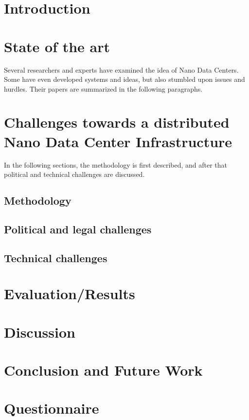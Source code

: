 
\section{Introduction}


\section{State of the art}
\label{StateOfTheArt}
Several researchers and experts have examined the idea of Nano Data Centers. Some have even developed systems and ideas, but also stumbled upon issues and hurdles. Their papers are summarized in the following paragraphs. 




\section{Challenges towards a distributed Nano Data Center Infrastructure}
\label{sec:challenges}
In the following sections, the methodology is first described, and after that political and technical challenges are discussed. 

\subsection{Methodology}



\subsection{Political and legal challenges}


\subsection{Technical challenges}


\section{Evaluation/Results}


\section{Discussion}



\section{Conclusion and Future Work}


\begin{acks}

\end{acks}




\appendix
\section{Questionnaire}

